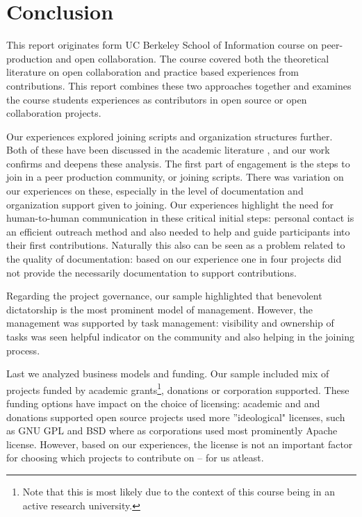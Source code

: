 \section{Conclusion}

This report originates form UC Berkeley School of Information course on peer-production and open collaboration. The course covered both the theoretical literature on open collaboration and practice based experiences from contributions. This report combines these two approaches together and examines the course students experiences as contributors in open source or open collaboration projects.

Our experiences explored joining scripts and organization structures further. Both of these have been discussed in the academic literature \cite{x,y,z}, and our work confirms and deepens these analysis. The first part of engagement is the steps to join in a peer production community, or joining scripts. There was variation on our experiences on these, especially in the level of documentation and organization support given to joining. Our experiences highlight the need for human-to-human communication in these critical initial steps: personal contact is an efficient outreach method and also needed to help and guide participants into their first contributions. Naturally this also can be seen as a problem related to the quality of documentation: based on our experience one in four projects did not provide the necessarily documentation to support contributions.

Regarding the project governance, our sample highlighted that benevolent dictatorship is the most prominent model of management. However, the management was supported by task management: visibility and ownership of tasks was seen helpful indicator on the community and also helping in the joining process.

Last we analyzed business models and funding. Our sample included mix of projects funded by academic grants\footnote{Note that this is most likely due to the context of this course being in an active research university.}, donations or corporation supported. These funding options have impact on the choice of licensing: academic and and donations supported open source projects used more ''ideological" licenses, such as GNU GPL and BSD where as corporations used most prominently Apache license. However, based on our experiences, the license is not an important factor for choosing which projects to contribute on -- for us atleast.


